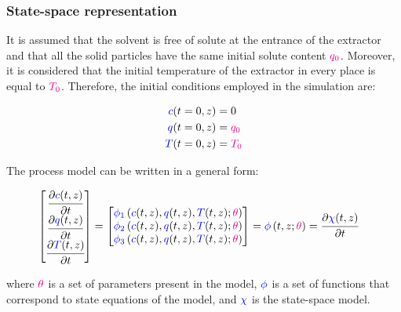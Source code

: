 \documentclass[../Article_Model_Parameters.tex]{subfiles}
\begin{document}
		\iffalse	
			
		\subsubsection{State-space representation} \label{CH: State_space}
		It is assumed that the solvent is free of solute at the entrance of the extractor and that all the solid particles have the same initial solute content ${\color{magenta}q_0}$. Moreover, it is considered that the initial temperature of the extractor in every place is equal to ${\color{magenta}T_0}$. Therefore, the initial conditions employed in the simulation are:
			
		{\footnotesize
			\begin{subequations}
				\begin{align*}
					{\color{blue}c}(t = 0, z) &= 0   \\
					{\color{blue}q}(t = 0, z) &= {\color{magenta}q_0} \\
					{\color{blue}T}(t = 0, z) &= {\color{magenta}T_0}
				\end{align*}
		\end{subequations} }
			
		The process model can be written in a general form:
			
		{\footnotesize
			\begin{align}
				\begin{bmatrix}
					\cfrac{\partial {\color{blue}c}(t,z)}{\partial t}\\
					\cfrac{\partial {\color{blue}q}(t,z)}{\partial t}\\
					\cfrac{\partial {\color{blue}T}(t,z)}{\partial t} 
				\end{bmatrix}
				& =
				\begin{bmatrix}
					{\color{blue}\phi_1} \left( {\color{blue}c}(t,z),{\color{blue}q}(t,z),{\color{blue}T}(t,z); {\color{magenta}\theta} \right)\\
					{\color{blue}\phi_2} \left( {\color{blue}c}(t,z),{\color{blue}q}(t,z),{\color{blue}T}(t,z); {\color{magenta}\theta} \right)\\
					{\color{blue}\phi_3} \left( {\color{blue}c}(t,z),{\color{blue}q}(t,z),{\color{blue}T}(t,z); {\color{magenta}\theta} \right)
				\end{bmatrix} = {\color{blue}\phi} \left( t,z; {\color{magenta}\theta} \right) = \cfrac{\partial {\color{blue}\chi}(t,z)}{\partial t}
		\end{align} }
			
		where ${\color{magenta}\theta}$ is a set of parameters present in the model, ${\color{blue}\phi}$ is a set of functions that correspond to state equations of the model, and ${\color{blue}\chi}$ is the state-space model.
		
\end{document}

